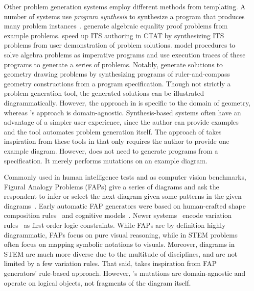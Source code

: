 Other problem generation systems employ different methods from templating. A number of systems use \emph{program synthesis} to synthesize a program that produces many problem instances~\cite{gulwani_example-based_2014}.  \citet{singh_automatically_2012} generate algebraic equality proof problems from example problems. \citet{machineTeaching} speed up ITS authoring in CTAT by synthesizing ITS problems from user demonstration of problem solutions. \citet{andersen_trace-based_2013} model procedures to solve algebra problems as imperative programs and use execution traces of these programs to generate a series of problems. Notably, \citet{gulwani_synthesizing_2011} generate solutions to geometry drawing problems by synthesizing programs of ruler-and-compass geometry constructions from a program specification. Though not strictly a problem generation tool, the generated solutions can be illustrated diagrammatically. However, the approach in \cite{gulwani_synthesizing_2011} is specific to the domain of geometry, whereas \Edgeworth's approach is domain-agnostic. Synthesis-based systems often have an advantage of a simpler user experience, since the author can provide examples and the tool automates problem generation itself. The approach of \Edgeworth takes inspiration from these tools in that \Edgeworth only requires the author to provide one example diagram. However, \Edgeworth does not need to generate programs from a specification. It merely performs mutations on an example diagram. 

Commonly used in human intelligence tests and as computer vision benchmarks, Figural Analogy Problems (FAPs) give a series of diagrams and ask the respondent to infer or select the next diagram given some patterns in the given diagrams~\cite{yang_automatic_2022}. Early automatic FAP generators were based on human-crafted shape composition rules~\cite{hornke_rule-based_1986} and cognitive models~\cite{embretson_cognitive_1998}. Newer systems~\cite{wang_automatic_2015,pmlr-v80-barrett18a} encode variation rules~\cite{carpenter_what_1990} as first-order logic constraints. While FAPs are by definition highly diagrammatic, FAPs focus on pure visual reasoning, while in STEM problems often focus on mapping symbolic notations to visuals. Moreover, diagrams in STEM are much more diverse due to the multitude of disciplines, and are not limited by a few variation rules. That said, \Edgeworth takes inspiration from FAP generators' rule-based approach. However, \Edgeworth's mutations are domain-agnostic and operate on logical objects, not fragments of the diagram itself.

